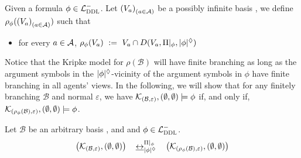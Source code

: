 \documentclass{llncs}
\newcommand{\buffer}[2]{{\sf b}_{#1}(#2)}
\newcommand{\shrink}[2]{\rho_{#1}(#2)}
\newcommand{\dlangm}{{\mathcal L}_{\acro{DDL}}^{-}}
\newcommand{\kmod}[2]{{\cal K}_{(#1,#2)}}
\newcommand{\basis}{basis }
\newcommand{\views}{\mathcal B}
\newcommand{\viewsv}{\left(V_a\right)_{(a \in \agents)}}
\newcommand{\sem}{\varepsilon}
\newcommand{\depth}[1]{|{#1}|^\adia}
\newcommand{\bisim}{\underline{\leftrightarrow}}
\begin{document}


\begin{definition}\label{def:shrink} Given a formula $\phi \in \dlangm$. Let $\viewsv$ be a possibly infinite \basis, we define $\shrink \phi \viewsv$ such that
\begin{itemize}
\item for every $a \in \mathcal A$, $\shrink \phi {V_a} ~:=~ V_a \cap D(V_a, \restr \Pi \phi, \depth{\phi})$
\end{itemize}
\end{definition}

Notice that the Kripke model for $\rho(\views)$ will have finite branching as long as the argument symbols in the $\depth{\phi}$-vicinity of the argument symbols in $\phi$ have finite branching in all agents' views. In the following, we
 will show that for any finitely branching $\views$ and normal $\sem$, we have $\kmod \views \sem, (\emptyset,\emptyset) \models \phi$ if, and only if, $\kmod {\shrink \phi \views} \sem, (\emptyset,\emptyset) \models \phi$. 

\begin{theorem} Let $\views$ be an arbitrary \basis, and and $\phi \in \dlangm$. 
$$ \left(\kmod \views \sem, (\emptyset,\emptyset)\right) \quad   \bisim_{\depth{\phi}}^{\restr \Pi \phi}  \quad \left(\kmod {\shrink \phi \views} \sem, (\emptyset,\emptyset)\right)$$
\end{theorem}
\end{document}
